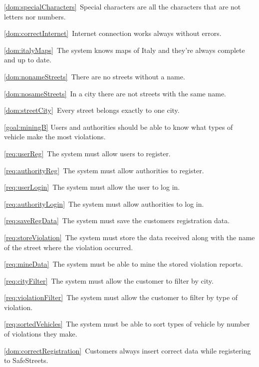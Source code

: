 \begin{description}
\begin{description}
\begin{description}
							\item \ref{dom:specialCharacters}\ Special characters are all the characters that are not letters nor numbers.
							\item \ref{dom:correctInternet}\ Internet connection works always without errors.
							\item \ref{dom:italyMaps}\ The system knows maps of Italy and they’re always complete and up to date.
							\item \ref{dom:nonameStreets}\ There are no streets without a name.
							\item \ref{dom:nosameStreets}\ In a city there are not streets with the same name.
							\item \ref{dom:streetCity}\ Every street belongs exactly to one city.
						\end{description}
					\item \ref{goal:miningB} Users and authorities should be able to know what types of vehicle make the most violations.
						\begin{description}
							\item \ref{req:userReg}\ The system must allow users to register.
							\item \ref{req:authorityReg}\ The system must allow authorities to register.
							\item \ref{req:userLogin}\ The system must allow the user to log in.
							\item \ref{req:authorityLogin}\ The system must allow authorities to log in.
							\item \ref{req:saveRegData}\ The system must save the customers registration data.
							\item \ref{req:storeViolation}\ The system must store the data received along with the name of the street where the violation occurred.
							\item \ref{req:mineData}\ The system must be able to mine the stored violation reports.
							\item \ref{req:cityFilter}\ The system must allow the customer to filter by city.
							\item \ref{req:violationFilter}\ The system must allow the customer to filter by type of violation.
							\item \ref{req:sortedVehicles}\ The system must be able to sort types of vehicle by number of violations they make.
							\item \ref{dom:correctRegistration}\ Customers always insert correct data while registering to SafeStreets.

\end{description}
\end{description}
\end{description}
